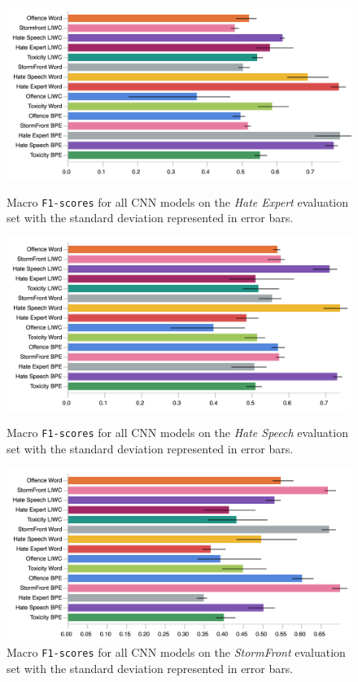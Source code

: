 \begin{figure}
\begin{minipage}{\textwidth}
\centering
    \includegraphics[width=\textwidth]{all_cnn_waseem_test.pdf}
    \caption{Macro \texttt{F1-scores} for all CNN models on the \textit{Hate Expert} evaluation set with the standard deviation represented in error bars.}
    \label{fig:waseem_cnn_test}
    \vfill
    \includegraphics[width=\textwidth]{all_cnn_waseem_hovy_test.pdf}
    \caption{Macro \texttt{F1-scores} for all CNN models on the \textit{Hate Speech} evaluation set with the standard deviation represented in error bars.}
  \label{fig:waseem_hovy_cnn_test}
\end{minipage}
\end{figure}

\begin{figure}
    \centering
    \includegraphics[width=\textwidth]{all_cnn_garcia_test.pdf}
  \caption{Macro \texttt{F1-scores} for all CNN models on the \textit{StormFront} evaluation set with the standard deviation represented in error bars.}
  \label{fig:garcia_cnn_test}
\end{figure}


